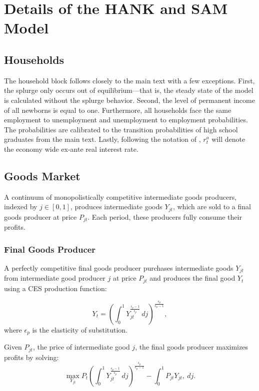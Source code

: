 \documentclass[\econtexRoot/HAFiscal]{subfiles}
\begin{document}
	
\FloatBarrier
\hypertarget{hank_appendix}{}\par\section{Details of the HANK and SAM Model}
\notinsubfile{\label{sec:hank_appendix}}


\subsection{Households}

The household block follows closely to the main text with a few exceptions. First, the splurge only occurs out of equilibrium---that is, the steady state of the model is calculated without the splurge behavior. Second, the level of permanent income of all newborns is equal to one. Furthermore, all households face the same employment to unemployment and unemployment to employment probabilities. The probabilities are calibrated to the transition probabilities of high school graduates from the main text. Lastly, following the notation of \cite{Auclert2020}, $r^{a}_{t}$ will denote the economy wide ex-ante real interest rate.


\subsection{Goods Market}

A continuum of monopolistically competitive intermediate goods producers, indexed by \( j \in [0,1] \), produces intermediate goods \( Y_{jt} \), which are sold to a final goods producer at price \( P_{jt} \). Each period, these producers fully consume their profits.


\subsubsection{Final Goods Producer}

A perfectly competitive final goods producer purchases intermediate goods \( Y_{jt} \) from intermediate good producer $j$ at price \( P_{jt} \) and produces the final good \( Y_t \) using a CES production function:

$$ Y_{t} = \left(\int_{0}^{1} Y_{jt}^{\frac{\epsilon_{p}-1}{\epsilon_{p}}}\, dj\right)^{\frac{\epsilon_{p}}{\epsilon_{p}-1}},$$ 
where $\epsilon_{p}$ is the elasticity of substitution.

Given $P_{jt}$, the price of intermediate good $j$, the final goods producer maximizes profits by solving:
$$ \max_{Y_{jt}} P_{t} \left(\int_{0}^{1} Y_{jt}^{\frac{\epsilon_{p}-1}{\epsilon_{p}}}\, dj\right)^{\frac{\epsilon_{p}}{\epsilon_{p}-1}} - \int_{0}^{1} P_{jt} Y_{jt} ,\ dj.$$ 
\end{document}
